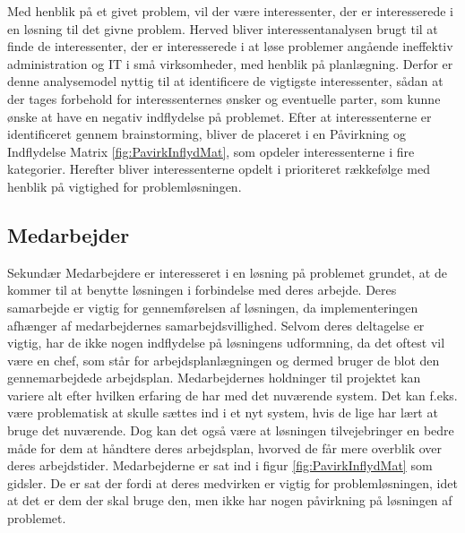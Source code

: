 Med henblik på et givet problem, vil der være interessenter, der er interesserede i en løsning til det givne problem. Herved bliver interessentanalysen brugt til at finde de interessenter, der er interesserede i at løse problemer angående ineffektiv administration og IT i små virksomheder, med henblik på planlægning.
Derfor er denne analysemodel nyttig til at identificere de vigtigste interessenter, sådan at der tages forbehold for interessenternes ønsker og eventuelle parter, som kunne ønske at have en negativ indflydelse på problemet. Efter at interessenterne er identificeret gennem brainstorming, bliver de placeret i en Påvirkning og Indflydelse Matrix \ref{fig:PavirkInflydMat}, som opdeler interessenterne i fire kategorier. Herefter bliver interessenterne opdelt i prioriteret rækkefølge med henblik på vigtighed for problemløsningen.

\subsection{Medarbejder} Sekundær
Medarbejdere er interesseret i en løsning på problemet grundet, at de kommer til at benytte løsningen i forbindelse med deres arbejde. Deres samarbejde er vigtig for gennemførelsen af løsningen, da implementeringen afhænger af medarbejdernes samarbejdsvillighed. Selvom deres deltagelse er vigtig, har de ikke nogen indflydelse på løsningens udformning, da det oftest vil være en chef, som står for arbejdsplanlægningen og dermed bruger de blot den gennemarbejdede arbejdsplan. Medarbejdernes holdninger til projektet kan variere alt efter hvilken erfaring de har med det nuværende system. Det kan f.eks. være problematisk at skulle sættes ind i et nyt system, hvis de lige har lært at bruge det nuværende. Dog kan det også være at løsningen tilvejebringer en bedre måde for dem at håndtere deres arbejdsplan, hvorved de får mere overblik over deres arbejdstider. Medarbejderne er sat ind i figur \ref{fig:PavirkInflydMat} som gidsler. De er sat der fordi at deres medvirken er vigtig for problemløsningen, idet at det er dem der skal bruge den, men ikke har nogen påvirkning på løsningen af problemet.

